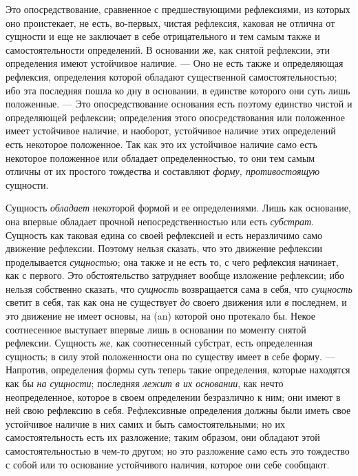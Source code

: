Это опосредствование, сравненное с предшествующими рефлексиями, из которых
оно проистекает, не есть, во-первых, чистая рефлексия, каковая не отлична
от сущности и еще не заключает в себе отрицательного и тем самым также и
самостоятельности определений. В основании же, как снятой рефлексии, эти
определения имеют устойчивое наличие. — Оно не есть также и определяющая
рефлексия, определения которой обладают существенной самостоятельностью;
ибо эта последняя пошла ко дну в основании, в единстве которого они суть
лишь положенные. — Это опосредствование основания есть поэтому единство
чистой и определяющей рефлексии; определения этого опосредствования или
положенное имеет устойчивое наличие, и наоборот, устойчивое наличие этих
определений есть некоторое положенное. Так как это их устойчивое наличие
само есть некоторое положенное или обладает определенностью, то они тем
самым отличны от их простого тождества и составляют
{\em форму, противостоящую} сущности.

Сущность {\em обладает} некоторой формой и ее
определениями. Лишь как основание, она впервые обладает прочной
непосредственностью или есть {\em субстрат}. Сущность
как таковая едина со своей рефлексией и есть неразличимо само движение
рефлексии. Поэтому нельзя сказать, что это движение рефлексии проделывается
{\em сущностью}; она также и не есть то, с чего
рефлексия начинает, как с первого. Это обстоятельство затрудняет вообще
изложение рефлексии; ибо нельзя собственно сказать, что
{\em сущность} возвращается сама в себя, что
{\em сущность} светит в себя, так как она не существует
{\em до} своего движения или
{\em в} последнем, и это движение не имеет основы, на
(an) которой оно протекало бы. Некое соотнесенное выступает впервые лишь в
основании по моменту снятой рефлексии. Сущность же, как соотнесенный
субстрат, есть определенная сущность; в силу этой положенности она по
существу имеет в себе форму. — Напротив, определения формы суть теперь
такие определения, которые находятся как бы {\em на
сущности}; последняя {\em лежит в их основании}, как
нечто неопределенное, которое в своем определении безразлично к ним; они
имеют в ней свою рефлексию в себя. Рефлексивные определения должны были
иметь свое устойчивое наличие в них самих и быть самостоятельными; но их
самостоятельность есть их разложение; таким образом, они обладают этой
самостоятельностью в чем-то другом; но это разложение само есть это
тождество с собой или то основание устойчивого наличия, которое они себе
сообщают.

